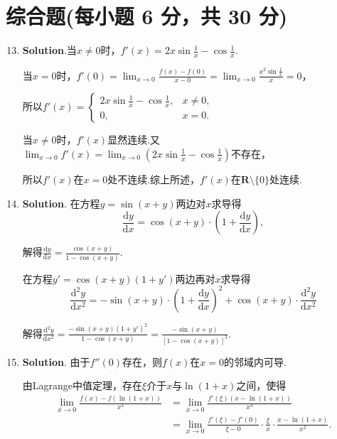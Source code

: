 \documentclass[../Main.tex]{subfiles}
\begin{document}
\section{综合题(每小题 6 分，共 30 分)}
\begin{enumerate}
    \setcounter{enumi}{12}
    \item \textbf{Solution}.当$x\neq0$时，$f'(x)=2x\sin\frac{1}{x}-\cos\frac{1}{x}$.

          当$x=0$时，$f'(0)=\lim_{x\to0}\frac{f(x)-f(0)}{x-0}=\lim_{x\to0}\frac{x^{2}\sin\frac{1}{x}}{x}
              =0$，

          所以$f'(x)=
              \begin{cases}
                  2x\sin\frac{1}{x}-\cos\frac{1}{x}, & x\neq0, \\
                  0,                                 & x=0.
              \end{cases}$

          当$x\neq0$时，$f'(x)$显然连续.又$\lim_{x\to0}f'(x)=\lim_{x\to0}\left(2x\sin
              \frac{1}{x}-\cos\frac{1}{x}\right)$不存在，

          所以$f'(x)$在$x=0$处不连续.综上所述，$f'(x)$在$\mathbf{R}\setminus\{0\}$处连续.

    \item \textbf{Solution}. 在方程$y=\sin(x+y)$两边对$x$求导得
          \[
              \frac{\mathrm{d}y}{\mathrm{d}x}=\cos(x+y)\cdot\left(1+\frac{\mathrm{d}y}{\mathrm{d}x}
              \right),
          \]

          解得$\frac{\mathrm{d}y}{\mathrm{d}x}=\frac{\cos(x+y)}{1-\cos(x+y)}$.

          在方程$y'=\cos(x+y)(1+y')$两边再对$x$求导得
          \[
              \frac{\mathrm{d}^{2}y}{\mathrm{d}x^{2}}= -\sin(x+y)\cdot\left(1+\frac{\mathrm{d}y}{\mathrm{d}x}
              \right)^{2}+\cos(x+y)\cdot\frac{\mathrm{d}^{2}y}{\mathrm{d}x^{2}}
          \]

          解得$\frac{\mathrm{d}^{2}y}{\mathrm{d}x^{2}}=\frac{-\sin(x+y)(1+y')^{2}}{1-\cos(x+y)}
              =\frac{-\sin(x+y)}{[1-\cos(x+y)]^{3}}$.

    \item \textbf{Solution}. 由于$f''(0)$存在，则$f(x)$在$x=0$的邻域内可导.

          由Lagrange中值定理，存在$\xi$介于$x$与$\ln(1+x)$之间，使得
          \[
              \begin{aligned}
                  \lim_{x\to0}\frac{f(x)-f(\ln(1+x))}{x^3} & =\lim_{x\to0}\frac{f'(\xi)(x-\ln(1+x))}{x^3}                                           \\
                                                           & =\lim_{x\to0}\frac{f'(\xi)-f'(0)}{\xi-0}\cdot\frac{\xi}{x}\cdot\frac{x-\ln(1+x)}{x^2}.
              \end{aligned}
          \]


\end{enumerate}
\end{document}
